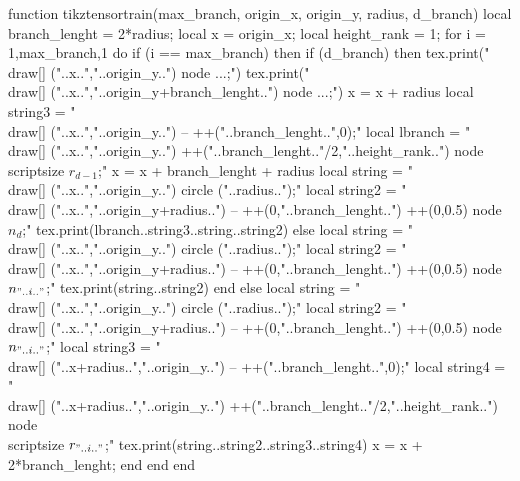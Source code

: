 \begin{luacode*}
function tikztensortrain(max_branch, origin_x, origin_y, radius, d_branch)
	 local branch_lenght = 2*radius;
	 local x = origin_x;
	 local height_rank = 1;
	 for i = 1,max_branch,1 do
			if (i == max_branch) then
				 if (d_branch) then
            tex.print("\\draw[] ("..x..","..origin_y..") node {...};")
            tex.print("\\draw[] ("..x..","..origin_y+branch_lenght..") node {...};")
            x = x + radius
            local string3 = "\\draw[] ("..x..","..origin_y..") -- ++("..branch_lenght..",0);"
            local lbranch = "\\draw[] ("..x..","..origin_y..") ++("..branch_lenght.."/2,"..height_rank..") node {\\scriptsize $r_{d-1}$};"
            x = x + branch_lenght + radius
            local string = "\\draw[] ("..x..","..origin_y..") circle ("..radius..");"
            local string2 = "\\draw[] ("..x..","..origin_y+radius..") -- ++(0,"..branch_lenght..") ++(0,0.5) node {$n_{d}$};"
            tex.print(lbranch..string3..string..string2)
				 else
            local string = "\\draw[] ("..x..","..origin_y..") circle ("..radius..");"
            local string2 = "\\draw[] ("..x..","..origin_y+radius..") -- ++(0,"..branch_lenght..") ++(0,0.5) node {$n_{"..i.."}$};"
            tex.print(string..string2)
				 end
			else
				 local string = "\\draw[] ("..x..","..origin_y..") circle ("..radius..");"
				 local string2 = "\\draw[] ("..x..","..origin_y+radius..") -- ++(0,"..branch_lenght..") ++(0,0.5) node {$n_{"..i.."}$};"
				 local string3 = "\\draw[] ("..x+radius..","..origin_y..") -- ++("..branch_lenght..",0);"
				 local string4 = "\\draw[] ("..x+radius..","..origin_y..") ++("..branch_lenght.."/2,"..height_rank..") node {\\scriptsize $r_{"..i.."}$};"
				 tex.print(string..string2..string3..string4)
				 x = x + 2*branch_lenght;
			end
	 end
end


\end{luacode*}

